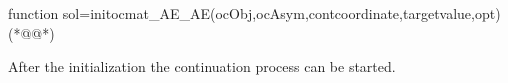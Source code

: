 \begin{matlab}
%
%
% 
%
% 
\end{matlab}
\begin{matlab}
function sol=initocmat_AE_AE(ocObj,ocAsym,contcoordinate,targetvalue,opt)(*@@*)
%
%
%
%
\end{matlab}
After the initialization the continuation process can be started.
